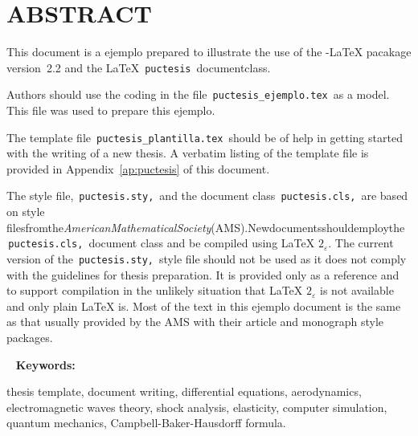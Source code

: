 \chapter*{ABSTRACT}
This document is a ejemplo prepared to illustrate the use of the \AmS-\LaTeX{} pacakage version~2.2 and the \LaTeX{} \,\verb+puctesis+\, documentclass.

Authors should use the coding in the file \,\verb+puctesis_ejemplo.tex+\, as a model.  This file was used to prepare this ejemplo.

The template file \,\verb+puctesis_plantilla.tex+\, should be of help in getting started with the writing of a new thesis. A verbatim listing of the template file is provided in Appendix~\ref{ap:puctesis} of this document.

The style file, \,\verb+puctesis.sty,+\, and the document class \,\verb+puctesis.cls,+\, are based on style files\hfill from\hfill the\hfill {\sl American\hfill Mathematical\hfill Society\/}\hfill (AMS).\hfill  New\hfill documents\hfill should\hfill employ\hfill the\\
\,\verb+puctesis.cls,+\, document class and be compiled using \LaTeX{} $2_\varepsilon$.  The current version of the \,\verb+puctesis.sty,+\, style file should not be used as it does not comply with the guidelines for thesis preparation.  It is provided only as a reference and to support compilation in the unlikely situation that \LaTeX{} $2_\varepsilon$ is not available and only plain \LaTeX{} is.  Most of the text in this ejemplo document is the same as that usually provided by the AMS with their article and monograph style packages.



~\vfill
{\bf Keywords:} \parbox[t]{.8\textwidth}{thesis template,
  document writing, differential equations, aerodynamics,
  electromagnetic waves theory, shock analysis, elasticity,
  computer simulation, quantum mechanics, 
  \mbox{Campbell-Baker-Hausdorff} formula.
}